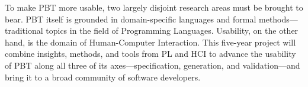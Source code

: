 


To make PBT more usable, two largely disjoint
research areas must be
brought to bear.  PBT itself is grounded in domain-specific languages
and formal methods---traditional topics in the field of Programming Languages.
Usability, on the other hand, is the domain of Human-Computer Interaction.
%
This five-year project will combine insights, methods, and tools from
PL and HCI to advance the usability of PBT along all three of its
axes---specification, generation, and validation\iflater{}\fi---and bring it to a
broad community of software developers.

